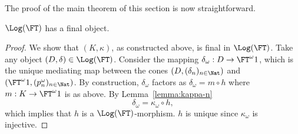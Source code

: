 \documentclass{entcs}
\begin{document}
The proof of the main theorem of this section is now straightforward.

\begin{thm} \label{thm:log-final}
$\Log(\FT)$ has a final object.
\end{thm}
%
\begin{proof}
  We show that $(K, \kappa)$, as constructed above, is final in
  $\Log(\FT)$. Take any object $(D, \delta) \in \Log(\FT)$.
%
Consider the mapping $\delta_{\omega}: D \to \FT^{\omega} 1$, which is the
unique mediating map between the cones $(D, (\delta_n)_{n \in \Nat})$ and
$(\FT^{\omega} 1, (p^{\omega}_n)_{n \in \Nat})$. By construction,
$\delta_{\omega}$ factors as $\delta_{\omega} = m\circ h$ where $m: K \to
\FT^{\omega} 1$ is as above. By Lemma~\ref{lemma:kappa-n}
$$\delta_{\omega} = \kappa_\omega\circ h,$$
which implies that $h$ is
a $\Log(\FT)$-morphism.
$h$ is unique since $\kappa_\omega$ is injective.
\end{proof}
\end{document}
